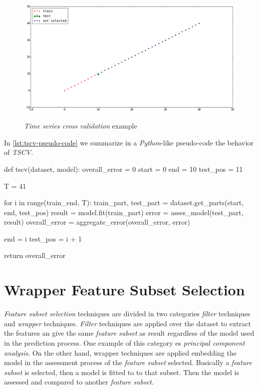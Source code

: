 \begin{figure}[bth]
  \myfloatalign
  {\includegraphics[width=1\linewidth]
    {gfx/tscv-example}}
  \caption{\textit{Time series cross validation} example}
  \label{fig:tscv-example}
\end{figure}

In \autoref{lst:tscv-pseudo-code} we summarize in a
\textit{Python}-like pseudo-code the behavior of \textit{TSCV}.

\begin{code}[language = Python, frame = single,
  caption = {\textit{TSCV} pseudo code},
  label = lst:tscv-pseudo-code,
  captionpos = b][bth]
def tscv(dataset, model):
  overall_error = 0
  start = 0
  end = 10 
  test_pos = 11

  T = 41

  for i in range(train_end, T):
    train_part, test_part = dataset.get_parts(start, end,
                                              test_pos)
    result = model.fit(train_part)
    error = asses_model(test_part, result)
    overall_error = aggregate_error(overall_error, error)

    end = i
    test_pos = i + 1

  return overall_error
\end{code}

\section{Wrapper Feature Subset Selection}
\label{sec:wfss}

\textit{Feature subset selection} techniques are divided in two
categories \textit{filter} techniques and \textit{wrapper} techniques.
\textit{Filter} techniques are applied over the dataset to extract the
features an give the same \textit{feature subset} as result regardless
of the model used in the prediction process. One example of this
category es \textit{principal component analysis}. On the other hand,
wrapper techniques are applied embedding the model in the assessment
process of the \textit{feature subset} selected. Basically a
\textit{feature subset} is selected, then a model is fitted to to that
subset. Then the model is assessed and compared to another
\textit{feature subset}.

